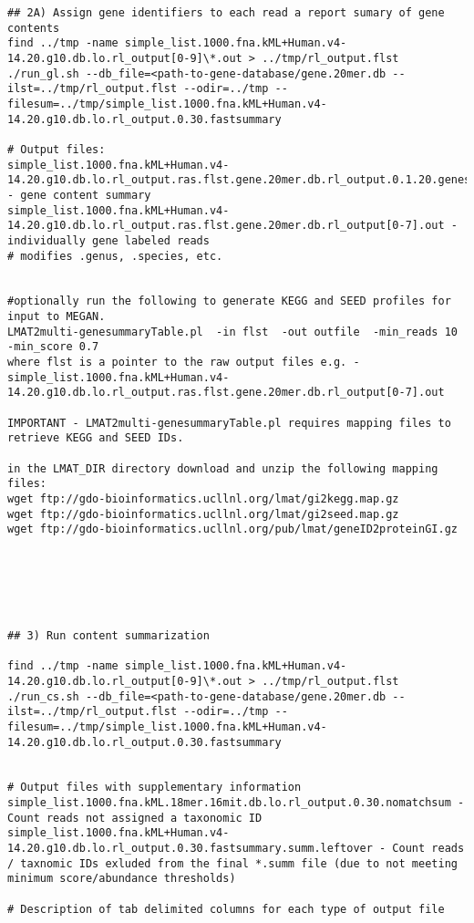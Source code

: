 \documentclass[11pt]{article}
\begin{document}
\begin{verbatim}
## 2A) Assign gene identifiers to each read a report sumary of gene contents
find ../tmp -name simple_list.1000.fna.kML+Human.v4-14.20.g10.db.lo.rl_output[0-9]\*.out > ../tmp/rl_output.flst
./run_gl.sh --db_file=<path-to-gene-database/gene.20mer.db --ilst=../tmp/rl_output.flst --odir=../tmp --filesum=../tmp/simple_list.1000.fna.kML+Human.v4-14.20.g10.db.lo.rl_output.0.30.fastsummary

# Output files:
simple_list.1000.fna.kML+Human.v4-14.20.g10.db.lo.rl_output.ras.flst.gene.20mer.db.rl_output.0.1.20.genesummary - gene content summary
simple_list.1000.fna.kML+Human.v4-14.20.g10.db.lo.rl_output.ras.flst.gene.20mer.db.rl_output[0-7].out - individually gene labeled reads
# modifies .genus, .species, etc.


#optionally run the following to generate KEGG and SEED profiles for input to MEGAN.
LMAT2multi-genesummaryTable.pl  -in flst  -out outfile  -min_reads 10 -min_score 0.7
where flst is a pointer to the raw output files e.g. - simple_list.1000.fna.kML+Human.v4-14.20.g10.db.lo.rl_output.ras.flst.gene.20mer.db.rl_output[0-7].out

IMPORTANT - LMAT2multi-genesummaryTable.pl requires mapping files to retrieve KEGG and SEED IDs.

in the LMAT_DIR directory download and unzip the following mapping files:
wget ftp://gdo-bioinformatics.ucllnl.org/lmat/gi2kegg.map.gz
wget ftp://gdo-bioinformatics.ucllnl.org/lmat/gi2seed.map.gz
wget ftp://gdo-bioinformatics.ucllnl.org/pub/lmat/geneID2proteinGI.gz






## 3) Run content summarization

find ../tmp -name simple_list.1000.fna.kML+Human.v4-14.20.g10.db.lo.rl_output[0-9]\*.out > ../tmp/rl_output.flst
./run_cs.sh --db_file=<path-to-gene-database/gene.20mer.db --ilst=../tmp/rl_output.flst --odir=../tmp --filesum=../tmp/simple_list.1000.fna.kML+Human.v4-14.20.g10.db.lo.rl_output.0.30.fastsummary


# Output files with supplementary information
simple_list.1000.fna.kML.18mer.16mit.db.lo.rl_output.0.30.nomatchsum - Count reads not assigned a taxonomic ID
simple_list.1000.fna.kML+Human.v4-14.20.g10.db.lo.rl_output.0.30.fastsummary.summ.leftover - Count reads / taxnomic IDs exluded from the final *.summ file (due to not meeting minimum score/abundance thresholds)

# Description of tab delimited columns for each type of output file


\end{verbatim}
\end{document}
